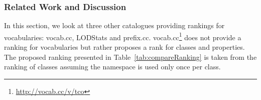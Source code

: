 \subsubsection{Related Work and Discussion}
\label{sec:related}
In this section, we look at three other catalogues providing rankings for vocabularies: vocab.cc, LODStats and prefix.cc. vocab.cc\footnote{\url{http://vocab.cc/v/tco}} does not provide a ranking for vocabularies but rather proposes a rank for classes and properties. The proposed ranking presented in Table~\ref{tab:compareRanking} is taken from the ranking of classes assuming the namespace is used only once per class.

\begin{table}[!htbp]
\end{table}

